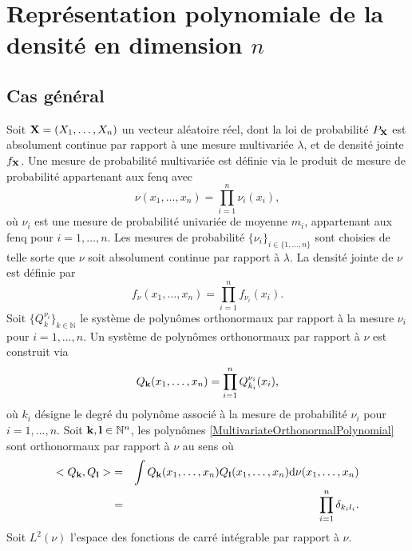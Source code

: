 \section{Représentation polynomiale de la densité en dimension $n$}\label{Chapter2Section4}
\subsection{Cas général}
Soit $\bold{X}=(X_{1},\ldots,X_{n})$ un vecteur aléatoire réel, dont la loi de probabilité $P_{\bold{X}}$ est absolument continue par rapport à une mesure multivariée $\lambda$, et de densité jointe $f_{\bold{X}}$. Une mesure de probabilité multivariée est définie via le produit de mesure de probabilité appartenant aux \gls{fenq} avec
\begin{equation}\label{FENQMultivariate}
\nu(x_{1},\ldots,x_{n})=\prod_{i=1}^{n}\nu_{i}(x_{i}),
\end{equation}
où $\nu_{i}$ est une mesure de probabilité univariée de moyenne $m_{i}$, appartenant aux \gls{fenq} pour $i=1,\ldots,n$. Les mesures de probabilité $\{\nu_{i}\}_{i\in\{1,\ldots,n\}}$ sont choisies de telle sorte que $\nu$ soit absolument continue par rapport à $\lambda$. La densité jointe de $\nu$ est définie par 
\begin{equation}\label{FENQDensity}
f_{\nu}(x_{1},\ldots,x_{n})=\prod_{i=1}^{n}f_{\nu_{i}}(x_{i}).
\end{equation}
Soit $\{Q^{\nu_{i}}_{k}\}_{k\in\mathbb{N}}$ le système de polynômes orthonormaux par rapport à la mesure $\nu_{i}$ pour $i=1,\ldots,n$. Un système de polynômes orthonormaux par rapport à $\nu$ est construit via 
\begin{equation}\label{MultivariateOrthonormalPolynomial}
Q_{\bold{k}}(x_{1},\ldots,x_{n})=\prod_{i=1}^{n}Q_{k_{i}}^{\nu_{i}}(x_{i}),
\end{equation}
où $k_{i}$ désigne le degré du polynôme associé à la mesure de probabilité $\nu_{i}$ pour $i=1,\ldots,n$. Soit $\bold{k},\bold{l}\in\mathbb{N}^{n}$, les polynômes \eqref{MultivariateOrthonormalPolynomial} sont orthonormaux par rapport à $\nu$ au sens où
\begin{eqnarray*}
<Q_{\bold{k}},Q_{\bold{l}}>&=&\int Q_{\bold{k}}(x_{1},\ldots,x_{n})Q_{\bold{l}}(x_{1},\ldots,x_{n})\text{d}\nu(x_{1},\ldots,x_{n})\\
&=&\prod_{i=1}^{n}\delta_{k_{i}l_{i}}.
\end{eqnarray*}
Soit $L^{2}(\nu)$ l'espace des fonctions de carré intégrable par rapport à $\nu$.
